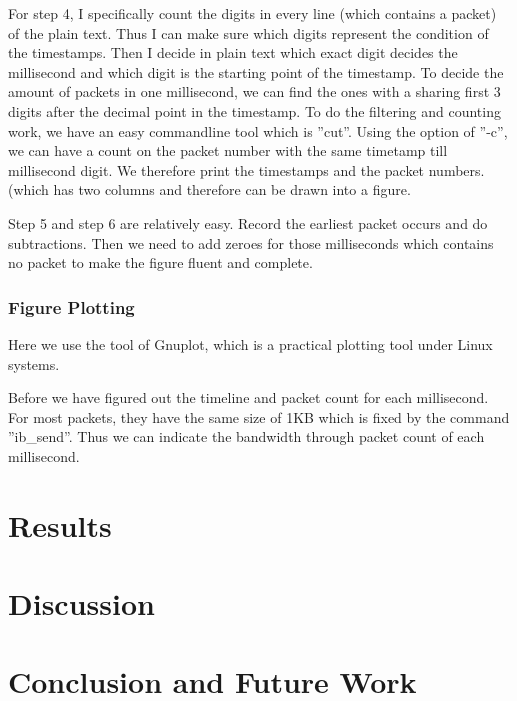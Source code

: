 \documentclass{article}
\begin{document}
For step 4, I specifically count the digits in every line (which contains a packet) of the plain text. Thus I can make sure which digits represent the condition
of the timestamps. 
Then I decide in plain text which exact digit decides the millisecond and which digit is the starting point of the timestamp.
To decide the amount of packets in one millisecond, we can find the ones with a sharing first 3 digits after the decimal point in the timestamp.
To do the filtering and counting work, we have an easy commandline tool which is ''cut''.
Using the option of ''-c'', we can have a count on the packet number with the same timetamp till millisecond digit.
We therefore print the timestamps and the packet numbers. (which has two columns and therefore can be drawn into a figure.

Step 5 and step 6 are relatively easy. 
Record the earliest packet occurs and do subtractions.
Then we need to add zeroes for those milliseconds which contains no packet to make the figure fluent and complete.

\subsubsection{Figure Plotting}

Here we use the tool of Gnuplot, which is a practical plotting tool under Linux systems.

Before we have figured out the timeline and packet count for each millisecond.
For most packets, they have the same size of 1KB which is fixed by the command ''ib\_send''.
Thus we can indicate the bandwidth through packet count of each millisecond.

\section{Results}

\section{Discussion}

\section{Conclusion and Future Work}






\end{document}
